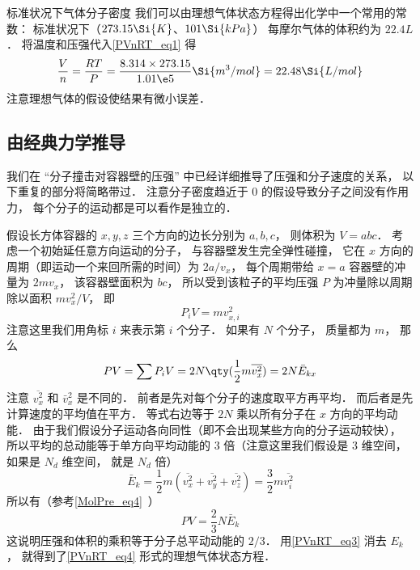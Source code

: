 \begin{example}{标准状况下气体分子密度}
我们可以由理想气体状态方程得出化学中一个常用的常数： 标准状况下（$273.15 \Si{K}$、$101 \Si{kPa}$） 每摩尔气体的体积约为 $22.4L$． 将温度和压强代入\autoref{PVnRT_eq1} 得
\begin{equation}
\frac{V}{n} = \frac{RT}{P} = \frac{8.314 \times 273.15}{1.01\e5}\Si{m^3/mol} = 22.48 \Si{L/mol}
\end{equation}
注意理想气体的假设使结果有微小误差．
\end{example}

\subsection{由经典力学推导}

我们在 “分子撞击对容器壁的压强” 中已经详细推导了压强和分子速度的关系， 以下重复的部分将简略带过． 注意分子密度趋近于 0 的假设导致分子之间没有作用力， 每个分子的运动都是可以看作是独立的．

假设长方体容器的 $x, y, z$ 三个方向的边长分别为 $a, b, c$， 则体积为  $V = abc$． 考虑一个初始延任意方向运动的分子， 与容器壁发生完全弹性碰撞， 它在 $x$ 方向的周期（即运动一个来回所需的时间）为 $2a/v_x$， 每个周期带给 $x = a$ 容器壁的冲量为 $2m v_x$， 该容器壁面积为 $bc$， 所以受到该粒子的平均压强 $P$ 为冲量除以周期除以面积 $mv_x^2/V$， 即
\begin{equation}
P_i V = mv_{x,i}^2
\end{equation}
注意这里我们用角标 $i$ 来表示第 $i$ 个分子． 如果有 $N$ 个分子， 质量都为 $m$， 那么
\begin{equation}
P V = \sum P_i V = 2 N \qty(\frac12 m \overline {v_x^2}) = 2 N \bar E_{kx}
\end{equation}
注意 $\overline {v_x^2}$ 和 $\bar v_x^2$ 是不同的． 前者是先对每个分子的速度取平方再平均． 而后者是先计算速度的平均值在平方． 等式右边等于 $2N$ 乘以所有分子在 $x$ 方向的平均动能． 由于我们假设分子运动各向同性（即不会出现某些方向的分子运动较快）， 所以平均的总动能等于单方向平均动能的 3 倍（注意这里我们假设是 3 维空间， 如果是 $N_d$ 维空间， 就是 $N_d$ 倍）
\begin{equation}
\bar E_k = \frac{1}{2} m (\overline {v_x^2} + \overline {v_y^2} + \overline {v_z^2}) = \frac{3}{2} m \overline {v_i^2}
\end{equation}
所以有（参考\autoref{MolPre_eq4}~）
\begin{equation}
P V = \frac23 N \bar E_k
\end{equation}
这说明压强和体积的乘积等于分子总平动动能的 $2/3$． 用\autoref{PVnRT_eq3} 消去 $E_k$， 就得到了\autoref{PVnRT_eq4} 形式的理想气体状态方程．
